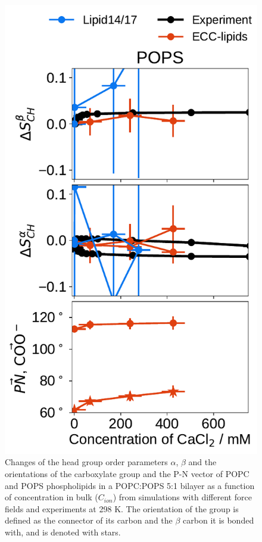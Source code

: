 \begin{figure}[htb!]
  \includegraphics[width=\figwidthsmall]{../img/ecc_pops/order_parameters_changes_ecc-lip_L14_A-B-PN-COO_POPS_cacl.pdf} 
  \caption{\label{fig:delta_ordPar_CaCl_PCPS} 
    Changes of the head group order parameters $\alpha$, $\beta$ and the orientations of the carboxylate group and the P-N vector  
    of POPC and POPS phospholipids in a POPC:POPS 5:1 bilayer as a function of  concentration 
    in bulk ($C_{ion}$) from simulations with different force fields and experiments at 298 K. \citep{roux90}
    The orientation of the  group is defined as the connector of its carbon and the $\beta$ carbon it is bonded with, and is denoted with stars. 
  } 
\end{figure} 



